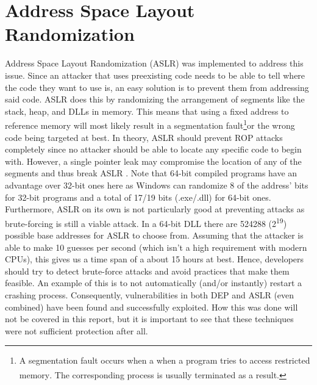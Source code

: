 \documentclass[10pt,twocolumn,a4paper]{article}
\begin{document}
\section{Address Space Layout Randomization}\label{sec:ASLR}
Address Space Layout Randomization (ASLR) was implemented to address this issue.
Since an attacker that uses preexisting code needs to be able to tell where the code they want to use is, an easy solution is to prevent them from addressing said code.
ASLR does this by randomizing the arrangement of segments like the stack, heap, and DLLs in memory\cite{ASLR}. This means that using a fixed address to reference memory will most likely result in a segmentation fault\footnote{A segmentation fault occurs when a when a program tries to access restricted memory\textsuperscript{\cite{SegFault}}. The corresponding process is usually terminated as a result.}or the wrong code being targeted at best.
In theory, ASLR should prevent ROP attacks completely since no attacker should be able to locate any specific code to begin with.
However, a single pointer leak may compromise the location of any of the segments and thus break ASLR \cite{bypass}. Note that 64-bit compiled programs have an advantage over 32-bit ones here as Windows can randomize 8 of the address' bits for 32-bit programs and a total of 17/19 bits (.exe/.dll) for 64-bit ones.\cite{ASLRBits2}
Furthermore, ASLR on its own is not particularly good at preventing attacks as brute-forcing is still a viable attack. In a 64-bit DLL there are 524288 (2\textsuperscript{19}) possible base addresses for ASLR to choose from\cite{ASLRBits}. Assuming that the attacker is able to make 10 guesses per second (which isn't a high requirement with modern CPUs), this gives us a time span of a about 15 hours at best.
Hence, developers should try to detect brute-force attacks and avoid practices that make them feasible. An example of this is to not automatically (and/or instantly) restart a crashing process\cite{ASLRBits}.
Consequently, vulnerabilities in both DEP and ASLR (even combined) have been found and successfully exploited\cite{bypass}\cite{ASLRBits2}.
How this was done will not be covered in this report, but it is important to see that these techniques were not sufficient protection after all.
\end{document}
